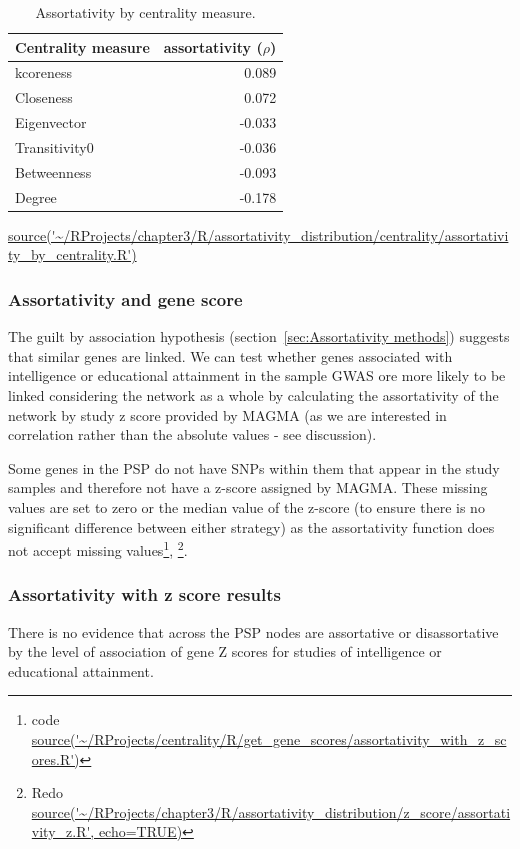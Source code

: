 \begin{table}[ht]
\centering
\begin{tabular}{lr}
  \toprule
Centrality measure & assortativity ($\rho$) \\ 
  \midrule
kcoreness & 0.089 \\ 
  Closeness & 0.072 \\ 
  Eigenvector & -0.033 \\ 
  Transitivity0 & -0.036 \\ 
  Betweenness & -0.093 \\ 
  Degree & -0.178 \\ 
   \bottomrule
\end{tabular}
\caption{Assortativity by centrality measure.}
\tiny\url{source('~/RProjects/chapter3/R/assortativity_distribution/centrality/assortativity_by_centrality.R')} 
\label{tab:assortativity by centrality}
\end{table}


\subsubsection{Assortativity and gene score}

 The guilt by association hypothesis (section~\ref{sec:Assortativity methods}) suggests that similar genes are linked. We can test whether genes associated with intelligence or educational attainment in the sample GWAS ore more likely to be linked considering the network as a whole by calculating the assortativity of the network by study z score provided by MAGMA (as we are interested in correlation rather than the absolute values - see discussion). 
 
 Some genes in the PSP do not have SNPs within them that appear in the study samples and therefore  not have a  z-score assigned by MAGMA. These missing values are set to zero or the median value of the z-score (to ensure there is no significant difference between either strategy) as the assortativity function does not accept missing values\footnote{code \url{source('~/RProjects/centrality/R/get_gene_scores/assortativity_with_z_scores.R')} },
\footnote{Redo \url{source('~/RProjects/chapter3/R/assortativity_distribution/z_score/assortativity_z.R', echo=TRUE)}}. 

\subsubsection{Assortativity with z score results}
 
 There is no evidence that across the PSP nodes are assortative or disassortative by the level of association of gene Z scores for studies of intelligence or educational attainment. 
 
